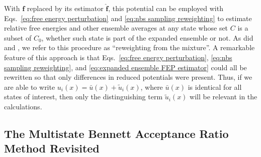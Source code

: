 \documentclass[journal=jctcce,manuscript=article,layout=twocolumn]{achemso}
\newcommand{\vt}[1]{\boldsymbol{\mathbf{#1}}}   %
\begin{document}
With $\vt f$ replaced by its estimator $\hat{\vt f}$, this potential can be employed with Eqs.~\eqref{eq:free energy perturbation} and \eqref{eq:nbs sampling reweighting} to estimate relative free energies and other ensemble averages at any state whose set $C$ is a subset of $C_0$, whether such state is part of the expanded ensemble or not. As did \citeauthor{Geyer_1994} \cite{Geyer_1994} and \citeauthor{Shirts_2017} \cite{Shirts_2017}, we refer to this procedure as ``reweighting from the mixture''. A remarkable feature of this approach is that Eqs.~\eqref{eq:free energy perturbation}, \eqref{eq:nbs sampling reweighting}, and \eqref{eq:expanded ensemble FEP estimator} could all be rewritten so that only differences in reduced potentials were present. Thus, if we are able to write $u_i(x) = {\bar u}(x) + \tilde{u}_i(x)$, where $\bar u(x)$ is identical for all states of interest, then only the distinguishing term $\tilde u_i(x)$ will be relevant in the calculations.

\subsection{The Multistate Bennett Acceptance Ratio Method Revisited}
\end{document}
